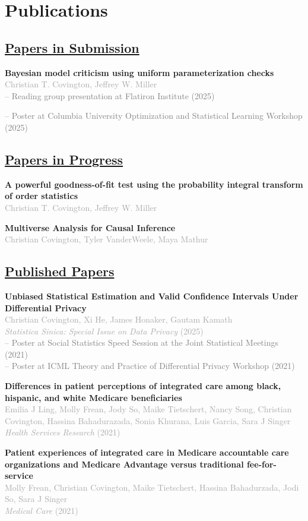 \documentclass[11pt,a4paper]{article}
\newcommand{\cvpub}[2]{
    \vspace{4pt}
    \noindent\textbf{#1} \\
    \textcolor{darkgray}{#2} \vspace{2pt}
}
\newcommand{\cvpres}[1]{
 \vspace{-6pt}
 \textcolor{gray}{\small \quad -- #1} \vspace{6pt}
}
\begin{document}
\section{Publications}

\subsection{\underline{Papers in Submission}}
\cvpub{Bayesian model criticism using uniform parameterization checks}
      {Christian T. Covington, Jeffrey W. Miller} \\
\cvpres{Reading group presentation at Flatiron Institute (2025)}
\cvpres{Poster at Columbia University Optimization and Statistical Learning Workshop (2025)}

\subsection{\underline{Papers in Progress}}
\cvpub{A powerful goodness-of-fit test using the probability integral transform of order statistics}
      {Christian T. Covington, Jeffrey W. Miller}

\cvpub{Multiverse Analysis for Causal Inference}
      {Christian Covington, Tyler VanderWeele, Maya Mathur}

\subsection{\underline{Published Papers}}
\cvpub{Unbiased Statistical Estimation and Valid Confidence Intervals Under Differential Privacy}
      {Christian Covington, Xi He, James Honaker, Gautam Kamath \\ 
       \textit{Statistica Sinica: Special Issue on Data Privacy} (2025)} \\
\cvpres{Poster at Social Statistics Speed Session at the Joint Statistical Meetings (2021)} \\
\cvpres{Poster at ICML Theory and Practice of Differential Privacy Workshop (2021)}

\cvpub{Differences in patient perceptions of integrated care among black, hispanic, and white Medicare beneficiaries}
      {Emilia J Ling, Molly Frean, Jody So, Maike Tietschert, Nancy Song, Christian Covington, Hassina Bahadurazada, Sonia Khurana, Luis Garcia, Sara J Singer \\ 
      \textit{Health Services Research} (2021)}

\cvpub{Patient experiences of integrated care in Medicare accountable care organizations and Medicare Advantage versus traditional fee-for-service}
      {Molly Frean, Christian Covington, Maike Tietschert, Hassina Bahadurzada, Jodi So, Sara J Singer \\ 
      \textit{Medical Care} (2021)}
\end{document}
